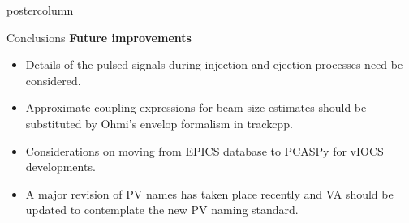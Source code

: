 \documentclass[20pt]{beamer}
\begin{document}
\begin{frame}
\begin{columns}
\begin{column}{.45\textwidth}
\begin{beamercolorbox}[center]{postercolumn}
\begin{minipage}{.98\textwidth}
{\begin{myblock}{Conclusions}
					\vspace{2cm}
					\textbf{Future improvements}
					\begin{itemize}
					\item Details of the pulsed signals during injection and ejection processes need be considered. 
					\item Approximate coupling expressions for beam size estimates should be substituted by Ohmi's envelop formalism in trackcpp.
					\item Considerations on moving from EPICS database to PCASPy for vIOCS developments. 
					\item A major revision of PV names has taken place recently and VA should be updated to contemplate the new PV naming standard.
					
					\end{itemize}
					\vspace{1cm}
					\end{myblock}
					\vspace{0.5cm}
		}\end{minipage}\end{beamercolorbox}
	\end{column}
\end{columns}
\end{frame}
\end{document}
